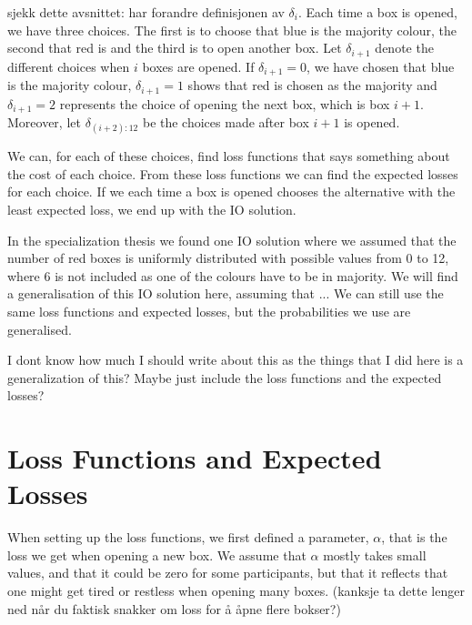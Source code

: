 sjekk dette avsnittet: har forandre definisjonen av $\delta_i.$
Each time a box is opened, we have three choices. The first is to choose that blue is the majority colour, the second that red is and the third is to open another box. Let $\delta_{i+1}$ denote the different choices when $i$ boxes are opened. If $\delta_{i+1}=0$, we have chosen that blue is the majority colour, $\delta_{i+1}=1$ shows that red is chosen as the majority and $\delta_{i+1}=2$ represents the choice of opening the next box, which is box $i+1$. Moreover, let $\delta_{(i+2):12}$ be the choices made after box $i+1$ is opened. 

We can, for each of these choices, find loss functions that says something about the cost of each choice. From these loss functions we can find the expected losses for each choice. If we each time a box is opened chooses the alternative with the least expected loss, we end up with the IO solution. 


In the specialization thesis we found one IO solution where we assumed that the number of red boxes is uniformly distributed with possible values from 0 to 12, where $6$ is not included as one of the colours have to be in majority. We will find a generalisation of this IO solution here, assuming that ... We can still use the same loss functions and expected losses, but the probabilities we use are generalised. 

I dont know how much I should write about this as the things that I did here is a generalization of this? Maybe just include the loss functions and the expected losses?

\section{Loss Functions and Expected Losses}
When setting up the loss functions, we first defined a parameter, $\alpha$, that is the loss we get when opening a new box. We assume that $\alpha$ mostly takes small values, and that it could be zero for some participants, but that it reflects that one might get tired or restless when opening many boxes. (kanksje ta dette lenger ned når du faktisk snakker om loss for å åpne flere bokser?)

